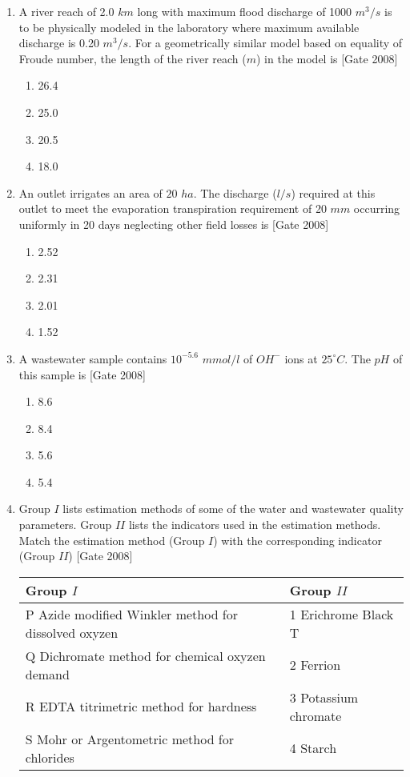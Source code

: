 \documentclass[journal]{IEEEtran}
\begin{document}
\begin{enumerate}
	\item A river reach of 2.0 $km$ long with maximum flood discharge of 1000 $m^3/s$ is to be physically modeled in the laboratory where maximum available discharge is 0.20 $m^3/s$. For 
a geometrically similar model based on equality of Froude number, the length of the river reach ($m$) in the model is \hfill [Gate 2008]
\begin{multicols}{2}
	\begin{enumerate}
		\item 26.4
		\item 25.0
		\item 20.5
		\item 18.0
	\end{enumerate}
\end{multicols}
	\item An outlet irrigates an area of $20$ $ha$. The discharge ($l/s$) required at this outlet to meet the evaporation transpiration requirement of 20 $mm$ occurring uniformly in 20 days neglecting other field losses is \hfill [Gate 2008]
		\begin{multicols}{2}
	\begin{enumerate}
		\item 2.52
		\item 2.31
		\item 2.01
		\item 1.52
	\end{enumerate}
\end{multicols}
	\item A wastewater sample contains $10^{-5.6}$ $mmol/l$ of $OH^{-}$ ions at $25 ^{\circ}C$. The $pH$ of this sample is
		\hfill [Gate 2008]
		\begin{multicols}{2}
	\begin{enumerate}
		\item 8.6
		\item 8.4
		\item 5.6
		\item 5.4
	\end{enumerate}
\end{multicols}
	\item Group $I$ lists estimation methods of some of the water and wastewater quality parameters. Group $II$ lists the indicators used in the estimation methods. Match the estimation method (Group $I$) with the corresponding indicator (Group $II$) \hfill [Gate 2008]
\begin{center}
		
\begin{tabular}{ |l| l|}
\hline
Group $I$ &  Group $II$ \\ 
\hline
P Azide modified Winkler method for dissolved oxyzen & 1 Erichrome Black T \\
\hline
Q Dichromate method for chemical oxyzen demand & 2 Ferrion \\
\hline
R EDTA titrimetric method for hardness & 3 Potassium chromate  \\
\hline
S Mohr or Argentometric method for chlorides &  4 Starch \\
\hline



\end{tabular}
\end{center}
\end{enumerate}
\end{document}
